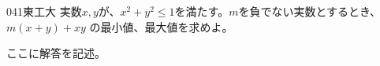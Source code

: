 \begin{prob}{041}{}{東工大}
 実数$x,y$が、$x^2+y^2\le 1$を満たす。$m$を負でない実数とするとき、$m(x+y)+xy$ の最小値、最大値を求めよ。
\end{prob}
ここに解答を記述。